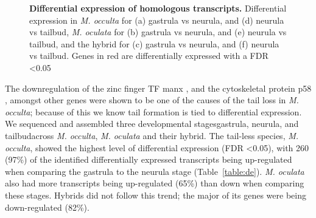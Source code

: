 \begin{figure}
{	}
	\caption{\textbf{Differential expression of homologous transcripts.} Differential expression in \textit{M. occulta} for (a) gastrula vs neurula, and (d) neurula vs tailbud, \textit{M. oculata} for (b) gastrula vs neurula, and (e) neurula vs tailbud, and the hybrid for (c) gastrula vs neurula, and (f) neurula vs tailbud. Genes in red are differentially expressed with a FDR \textless 0.05}
	\label{fig:de_plots}
\end{figure}

The downregulation of the zinc finger TF manx \cite{swalla_requirement_1996}, and the cytoskeletal protein p58 \cite{swalla_identification_1991}, amongst other genes were shown to be one of the causes of the tail loss in \textit{M. occulta}; because of this we know tail formation is tied to differential expression. We sequenced and assembled three developmental stages\textemdash gastrula, neurula, and tailbud\textemdash across \textit{M. occulta}, \textit{M. oculata} and their hybrid. The tail-less species, \textit{M. occulta}, showed the highest level of differential expression (FDR \textless 0.05), with 260 (97\%) of the identified differentially expressed transcripts being up-regulated when comparing the gastrula to the neurula stage (Table~\ref{table:de}). \textit{M. oculata} also had more transcripts being up-regulated (65\%) than down when comparing these stages. Hybrids did not follow this trend; the major of its genes were being down-regulated (82\%).  

